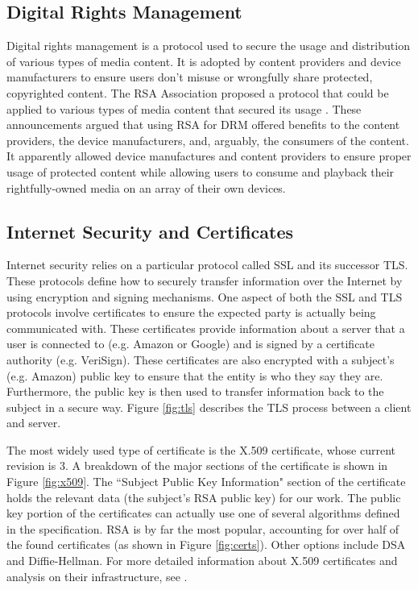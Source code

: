 \documentclass[12pt]{ucthesis}
\begin{document}
\subsection{Digital Rights Management}
Digital rights management is a protocol used to secure the usage and
distribution of various types of media content. It is adopted by content
providers and device manufacturers to ensure users don't misuse or wrongfully 
share protected, copyrighted content.
The RSA Association proposed a protocol that could be applied to various types
of media content that secured its usage \cite{rsa2004announces,
rsa2004supports}. These announcements argued that using RSA for DRM offered
benefits to the content providers, the device manufacturers, and, arguably, the
consumers of the content. It apparently allowed device manufactures and
content providers to ensure proper usage of protected content while allowing
users to consume and playback their rightfully-owned media on an array of
their own devices.

\subsection{Internet Security and Certificates}
Internet security relies on a particular protocol called SSL and its successor
TLS. These protocols define how to securely transfer information over the
Internet by using encryption and signing mechanisms. One aspect of both the SSL
and TLS protocols involve certificates to ensure the expected party is
actually being communicated with. These certificates provide information
about a server that a user is connected to (e.g. Amazon or Google)
and is signed by a certificate authority (e.g. VeriSign). These certificates
are also encrypted with a subject's (e.g. Amazon) public key to ensure that
the entity is who they say they are. Furthermore, the public key is then used 
to transfer information back to the subject in a secure way. Figure
\ref{fig:tls} describes the TLS process between a client and server. 

The most widely used type of certificate is the X.509 certificate, whose current
revision is 3. A breakdown of the major sections of the certificate is shown in
Figure \ref{fig:x509}. The ``Subject Public Key Information" section of the
certificate holds the relevant data (the subject's RSA public key) for our work.
The public key portion of the certificates can actually use one of several
algorithms defined in the specification. RSA is by far the most popular,
accounting for over half of the found certificates (as shown in Figure
\ref{fig:certs}). Other options include DSA and Diffie-Hellman. For more
detailed information about X.509 certificates and analysis on their
infrastructure, see \cite{holz2011ssl}.
\end{document}
